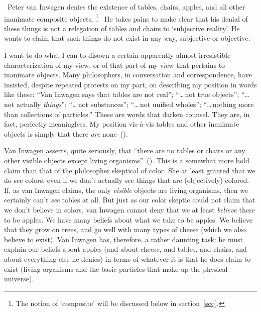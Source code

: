 \documentclass[11pt]{article}
\newenvironment{squote}{%
	\begin{spacing}{1}
	\begin{list}{}{%
	\setlength{\labelwidth}{0pt}%
	\rightmargin\leftmargin%
	}
	\item\relax
	}{%
	\end{list}%
	\end{spacing}
	}
\begin{document}
\begin{spacing}{1.5}
\ Peter van Inwagen denies the existence of tables, chairs, apples,
and all other inanimate composite objects.
%
\footnote{The notion of `composite' will be discussed below in
  section~\ref{scq}.}
%
\ He takes pains to make clear that his denial of these things is not
a relegation of tables and chairs to `subjective reality'.  He wants
to claim that such things do not exist in any way, subjective or
objective:
\begin{squote}
I want to do what I can to disown a certain apparently almost
irresistible characterization of my view, or of that part of my view
that pertains to inanimate objects.  Many philosophers, in
conversation and correspondence, have insisted, despite repeated
protests on my part, on describing my position in words like these:
``Van Inwagen says that tables are not real''; ``\ldots\,not true
objects''; ``\ldots\,not actually {\em things}''; ``\ldots\,not
substances''; ``\ldots\,not unified wholes''; ``\ldots\,nothing more
than collections of particles.''  These are words that darken counsel.
They are, in fact, perfectly meaningless.  My position vis-\`{a}-vis
tables and other inanimate objects is simply that there {\em are}
none~(\citeyear[99]{inwagen1995}).
\end{squote}
Van Inwagen asserts, quite seriously, that ``there are no tables or
chairs or any other visible objects except living
organisms''~(\citeyear[1]{inwagen1995}).  This is a somewhat more bold
claim than that of the philosopher skeptical of color.  She at least
granted that we do see colors, even if we don't actually see things
that are (objectively) colored.  If, as van Inwagen claims, the only
{\em visible} objects are living organisms, then we certainly can't
{\em see} tables at all.  But just as our color skeptic could not
claim that we don't believe in colors, van Inwagen cannot deny that we
at least {\em believe} there to be apples.  We have many beliefs about
what we take to be apples.  We believe that they grow on trees, and go
well with many types of cheese (which we also believe to exist).  Van
Inwagen has, therefore, a rather daunting task: he must explain our
beliefs about apples (and about cheese, and tables, and chairs, and
about everything else he denies) in terms of whatever it is that he
does claim to exist (living organisms and the basic particles that
make up the physical universe).


\end{spacing}
\end{document}
